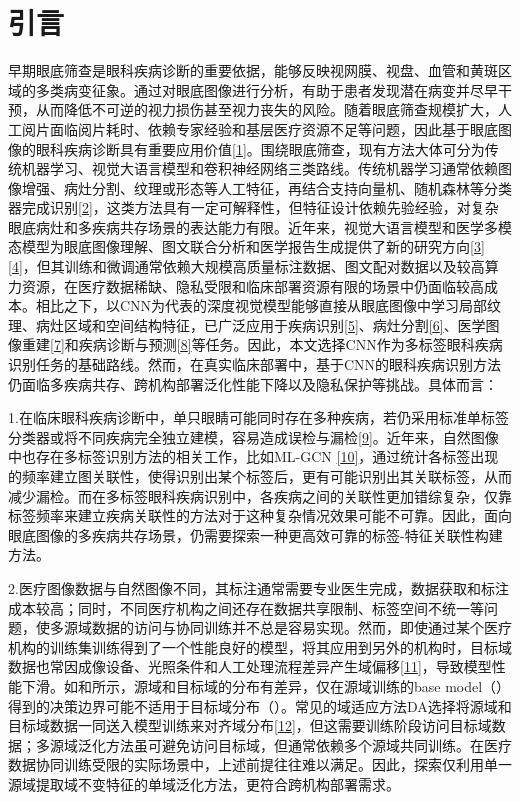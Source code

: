 \section{引言}\label{ux5f15ux8a00}

早期眼底筛查是眼科疾病诊断的重要依据，能够反映视网膜、视盘、血管和黄斑区域的多类病变征象。通过对眼底图像进行分析，有助于患者发现潜在病变并尽早干预，从而降低不可逆的视力损伤甚至视力丧失的风险。随着眼底筛查规模扩大，人工阅片面临阅片耗时、依赖专家经验和基层医疗资源不足等问题，因此基于眼底图像的眼科疾病诊断具有重要应用价值\hyperref[_Ref213949315]{{[}1{]}}。围绕眼底筛查，现有方法大体可分为传统机器学习、视觉大语言模型和卷积神经网络三类路线。传统机器学习通常依赖图像增强、病灶分割、纹理或形态等人工特征，再结合支持向量机、随机森林等分类器完成识别\hyperref[_RefRahman2022MLFundus]{{[}2{]}}，这类方法具有一定可解释性，但特征设计依赖先验经验，对复杂眼底病灶和多疾病共存场景的表达能力有限。近年来，视觉大语言模型和医学多模态模型为眼底图像理解、图文联合分析和医学报告生成提供了新的研究方向\hyperref[_RefLim2024VLVOphthalmology]{{[}3{]}}\hyperref[_RefUrooj2025LLMMedicalImage]{{[}4{]}}，但其训练和微调通常依赖大规模高质量标注数据、图文配对数据以及较高算力资源，在医疗数据稀缺、隐私受限和临床部署资源有限的场景中仍面临较高成本。相比之下，以CNN为代表的深度视觉模型能够直接从眼底图像中学习局部纹理、病灶区域和空间结构特征，已广泛应用于疾病识别\hyperref[_Ref213871637]{{[}5{]}}、病灶分割\hyperref[_Ref213948625]{{[}6{]}}、医学图像重建\hyperref[_Ref213948898]{{[}7{]}}和疾病诊断与预测\hyperref[_Ref213949262]{{[}8{]}}等任务。因此，本文选择CNN作为多标签眼科疾病识别任务的基础路线。然而，在真实临床部署中，基于CNN的眼科疾病识别方法仍面临多疾病共存、跨机构部署泛化性能下降以及隐私保护等挑战。具体而言：

1.在临床眼科疾病诊断中，单只眼睛可能同时存在多种疾病，若仍采用标准单标签分类器或将不同疾病完全独立建模，容易造成误检与漏检\hyperref[_Ref213949362]{{[}9{]}}。近年来，自然图像中也存在多标签识别方法的相关工作，比如ML-GCN \hyperref[_Ref213949382]{{[}10{]}}，通过统计各标签出现的频率建立图关联性，使得识别出某个标签后，更有可能识别出其关联标签，从而减少漏检。而在多标签眼科疾病识别中，各疾病之间的关联性更加错综复杂，仅靠标签频率来建立疾病关联性的方法对于这种复杂情况效果可能不可靠。因此，面向眼底图像的多疾病共存场景，仍需要探索一种更高效可靠的标签-特征关联性构建方法。

2.医疗图像数据与自然图像不同，其标注通常需要专业医生完成，数据获取和标注成本较高；同时，不同医疗机构之间还存在数据共享限制、标签空间不统一等问题，使多源域数据的访问与协同训练并不总是容易实现。然而，即使通过某个医疗机构的训练集训练得到了一个性能良好的模型，将其应用到另外的机构时，目标域数据也常因成像设备、光照条件和人工处理流程差异产生域偏移\hyperref[_Ref213949348]{{[}11{]}}，导致模型性能下滑。如和所示，源域和目标域的分布有差异，仅在源域训练的base model（）得到的决策边界可能不适用于目标域分布（）。常见的域适应方法DA选择将源域和目标域数据一同送入模型训练来对齐域分布\hyperref[_Ref213949354]{{[}12{]}}，但这需要训练阶段访问目标域数据；多源域泛化方法虽可避免访问目标域，但通常依赖多个源域共同训练。在医疗数据协同训练受限的实际场景中，上述前提往往难以满足。因此，探索仅利用单一源域提取域不变特征的单域泛化方法，更符合跨机构部署需求。

